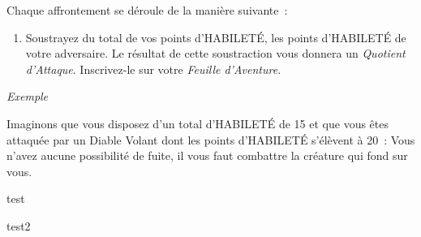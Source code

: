\documentclass[11pt]{book}
\begin{document}
Chaque affrontement se déroule de la manière suivante~:
\begin{enumerate}
  \item Soustrayez du total de vos points d'HABILETÉ, les points d'HABILETÉ de
  votre adversaire. Le résultat de cette soustraction vous donnera un
  \textit{Quotient d'Attaque}. Inscrivez-le sur votre \textit{Feuille d'Aventure}.
\end{enumerate}

\begin{center}
  \textit{Exemple}
\end{center}
Imaginons que vous disposez d'un total d'HABILETÉ de 15 et que vous êtes attaquée
par un Diable Volant dont les points d'HABILETÉ s'élèvent à 20~: Vous n'avez aucune
possibilité de fuite, il vous faut combattre la créature qui fond sur vous.



\mainmatter
\pagestyle{mainmatterstyle}

test

\newpage

test2

\newpage
\end{document}
